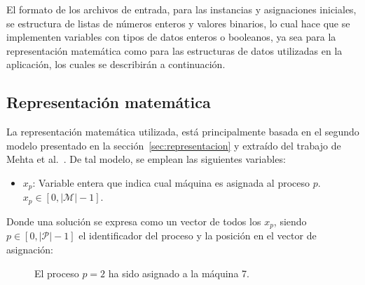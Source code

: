 \documentclass[../informe2.tex]{subfiles}
\begin{document}
El formato de los archivos de entrada, para las instancias y asignaciones iniciales, se estructura de listas de números enteros y valores binarios, lo cual hace que se implementen variables con tipos de datos enteros o booleanos, ya sea para la representación matemática como para las estructuras de datos utilizadas en la aplicación, los cuales se describirán a continuación.
\subsection{Representación matemática}
La representación matemática utilizada, está principalmente basada en el segundo modelo presentado en la sección~\ref{sec:representacion} y  extraído del trabajo de Mehta et al.~\cite{mehta2012comparing}. De tal modelo, se emplean las siguientes variables:
\begin{itemize}
	\item $x_p$: Variable entera que indica cual máquina es asignada al proceso $p$. $x_p \in [0,|\mathcal{M}|-1]$.
\end{itemize}
Donde una solución se expresa como un vector de todos los $x_p$, siendo $p \in [0,|\mathcal{P}|-1]$ el identificador del proceso y la posición en el vector de asignación:
\begin{figure}[h]
	\centering
	\caption{\small El proceso $p = 2$ ha sido asignado a la máquina 7.}\label{vectorsolucion}
\end{figure}
\end{document}
